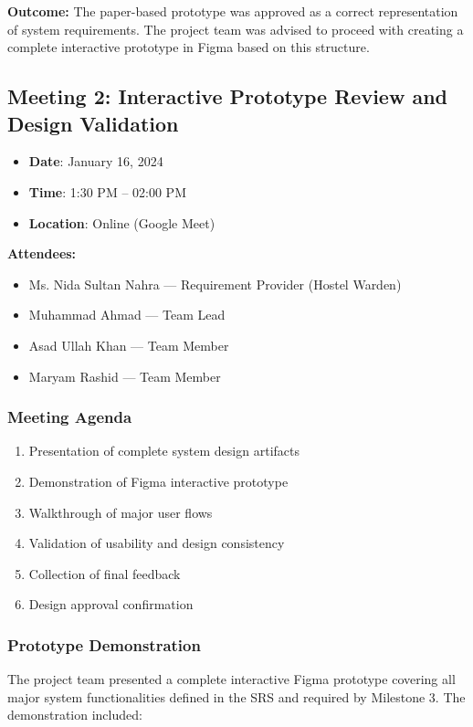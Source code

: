 \documentclass[12pt]{article}
\begin{document}
\textbf{Outcome:}  
The paper-based prototype was approved as a correct representation of system requirements. The project team was advised to proceed with creating a complete interactive prototype in Figma based on this structure.

\subsection{Meeting 2: Interactive Prototype Review and Design Validation}

\begin{itemize}
\item \textbf{Date}: January 16, 2024   
\item \textbf{Time}: 1:30 PM -- 02:00 PM  
\item \textbf{Location}: Online (Google Meet)
\end{itemize}

\textbf{Attendees:}
\begin{itemize}
\item Ms. Nida Sultan Nahra --- Requirement Provider (Hostel Warden)
\item Muhammad Ahmad --- Team Lead
\item Asad Ullah Khan --- Team Member
\item Maryam Rashid --- Team Member
\end{itemize}

\subsubsection{Meeting Agenda}
\begin{enumerate}
\item Presentation of complete system design artifacts
\item Demonstration of Figma interactive prototype
\item Walkthrough of major user flows
\item Validation of usability and design consistency
\item Collection of final feedback
\item Design approval confirmation
\end{enumerate}

\subsubsection{Prototype Demonstration}
The project team presented a complete interactive Figma prototype covering all major system functionalities defined in the SRS and required by Milestone 3. The demonstration included:
\end{document}
